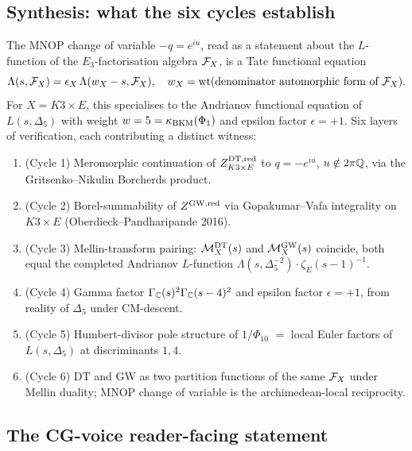\subsection*{Synthesis: what the six cycles establish}

The MNOP change of variable $-q=e^{iu}$, read as a statement about
the $L$-function of the $E_3$-factorisation algebra $\mathcal{F}_X$, is a
Tate functional equation
\[
\Lambda(s,\mathcal{F}_X)=\epsilon_X\,\Lambda(w_X-s,\mathcal{F}_X),\quad
w_X=\mathrm{wt}(\text{denominator automorphic form of }\mathcal{F}_X).
\]
For $X=K3\times E$, this specialises to the Andrianov functional
equation of $L(s,\Delta_5)$ with weight $w=5=\kappa_{\mathrm{BKM}}(\Phi_1)$ and
epsilon factor $\epsilon=+1$. Six layers of verification, each
contributing a distinct witness:

\begin{enumerate}[label=(\arabic*)]
\item (Cycle 1) Meromorphic continuation of $Z^{\mathrm{DT},\mathrm{red}}_{K3\times E}$
  to $q=-e^{iu}$, $u\notin 2\pi\mathbb{Q}$, via the Gritsenko--Nikulin
  Borcherds product.
\item (Cycle 2) Borel-summability of $Z^{\mathrm{GW},\mathrm{red}}$ via
  Gopakumar--Vafa integrality on $K3\times E$ (Oberdieck--Pandharipande
  2016).
\item (Cycle 3) Mellin-transform pairing: $\mathcal{M}^{\mathrm{DT}}_X(s)$ and
  $\mathcal{M}^{\mathrm{GW}}_X(s)$ coincide, both equal the completed Andrianov
  $L$-function $\Lambda(s,\Delta_5^{-2})\cdot\zeta_E(s-1)^{-1}$.
\item (Cycle 4) Gamma factor $\Gamma_{\mathbb{C}}(s)^2\Gamma_{\mathbb{C}}(s-4)^2$ and
  epsilon factor $\epsilon=+1$, from reality of $\Delta_5$ under
  CM-descent.
\item (Cycle 5) Humbert-divisor pole structure of $1/\Phi_{10}$
  $=$ local Euler factors of $L(s,\Delta_5)$ at
  discriminants $1,4$.
\item (Cycle 6) DT and GW as two partition functions of the same
  $\mathcal{F}_X$ under Mellin duality; MNOP change of variable is the
  archimedean-local reciprocity.
\end{enumerate}

\subsection*{The CG-voice reader-facing statement}

